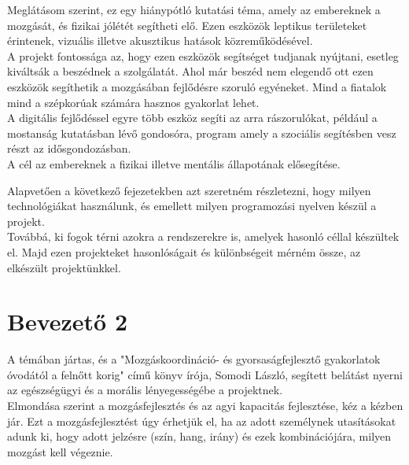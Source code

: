 \documentclass[tocnopagenum]{thesis-ekf}
\theoremstyle{definition}
\theoremstyle{remark}
\begin{document}
	Meglátásom szerint, ez egy hiánypótló kutatási téma, amely az embereknek a mozgását, és fizikai jólétét segítheti elő.
	Ezen eszközök leptikus területeket érintenek, vizuális illetve akusztikus hatások közreműködésével.
	\\
	A projekt fontossága az, hogy ezen eszközök segítséget tudjanak nyújtani, esetleg kiváltsák a beszédnek a szolgálatát. Ahol már beszéd nem elegendő ott ezen eszközök segíthetik a mozgásában fejlődésre szoruló egyéneket. Mind a fiatalok mind a szépkorúak számára hasznos gyakorlat lehet.
	\\ 
	A digitális fejlődéssel egyre több eszköz segíti az arra rászorulókat, például a mostanság kutatásban lévő gondosóra, program amely a szociális segítésben vesz részt az idősgondozásban.\cite{MTI}
	\\
	A cél az embereknek a fizikai illetve mentális állapotának elősegítése.
	\par 
	
	Alapvetően a következő fejezetekben azt szeretném részletezni, hogy milyen technológiákat használunk, és emellett milyen programozási nyelven készül a projekt. \\ 
	Továbbá, ki fogok térni azokra a rendszerekre is, amelyek hasonló céllal készültek el. Majd ezen projekteket hasonlóságait és különbségeit mérném össze, az elkészült projektünkkel. 
	

	\chapter*{Bevezető 2}
	\par
	A témában jártas, és a "Mozgáskoordináció- és gyorsaságfejlesztő gyakorlatok óvodától a felnőtt korig" \cite{SLaszlo} című könyv írója, Somodi László, segített belátást nyerni az egészségügyi és a morális lényegességébe a projektnek. \\ Elmondása szerint a mozgásfejlesztés és az agyi kapacitás fejlesztése, kéz a kézben jár. Ezt a mozgásfejlesztést úgy érhetjük el, ha az adott személynek utasításokat adunk ki, hogy adott jelzésre (szín, hang, irány) és ezek kombinációjára, milyen mozgást kell végeznie.
	\par 
\end{document}
